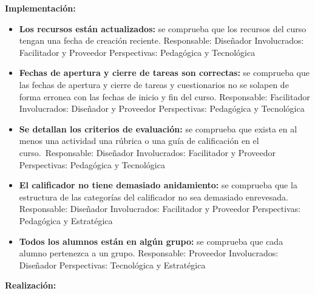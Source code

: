 \textbf{Implementación:}

\begin{itemize}
	\item
	\textbf{Los recursos están actualizados:} se comprueba que los
	recursos del curso tengan una fecha de creación reciente.
	{Responsable:} Diseñador {Involucrados:} Facilitador y
	Proveedor {Perspectivas:} Pedagógica y Tecnológica
	\item
	\textbf{Fechas de apertura y cierre de tareas son correctas:} se
	comprueba que las fechas de apertura y cierre de tareas y
	cuestionarios no se solapen de forma erronea con las fechas de inicio
	y fin del curso. {Responsable:} Facilitador
	{Involucrados:} Diseñador y Proveedor {Perspectivas:}
	Pedagógica y Tecnológica
	\item
	\textbf{Se detallan los criterios de evaluación:} se comprueba que
	exista en al menos una actividad una rúbrica o una guía de calificación
	en el curso.~{Responsable:} Diseñador {Involucrados:}
	Facilitador y Proveedor {Perspectivas:} Pedagógica y Tecnológica
	\item
	\textbf{El calificador no tiene demasiado anidamiento:} se comprueba
	que la estructura de las categorías del calificador no sea demasiado
	enrevesada. {Responsable:} Diseñador {Involucrados:}
	Facilitador y Proveedor {Perspectivas:} Pedagógica y Estratégica
	\item
	\textbf{Todos los alumnos están en algún grupo:} se comprueba que cada
	alumno pertenezca a un grupo. {Responsable:} Proveedor
	{Involucrados:} Diseñador {Perspectivas:} Tecnológica y
	Estratégica
\end{itemize}

\textbf{Realización:}

